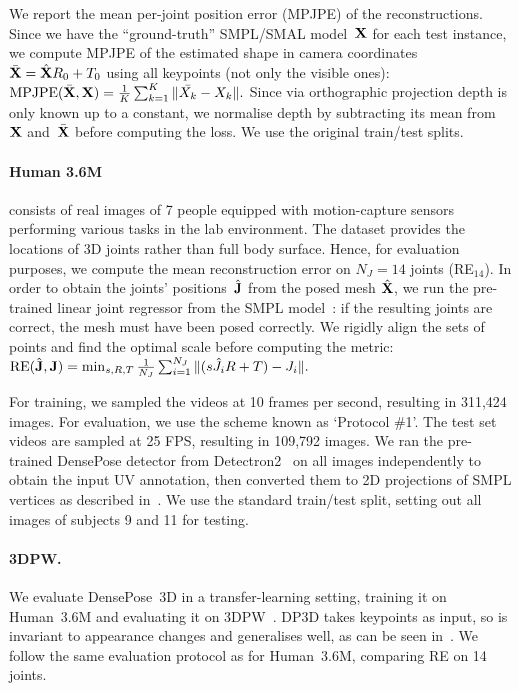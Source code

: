 We report the mean per-joint position error (MPJPE) of the reconstructions.
Since we have the ``ground-truth'' SMPL/SMAL model~$\mathbf{X}$ for each test instance, we compute MPJPE of the estimated shape in camera coordinates~$\bar{\mathbf{X}} = \hat{\mathbf{X}} R_0 + T_0$ using all keypoints (not only the visible ones):
$
\textrm{MPJPE}(\bar{\mathbf{X}}, \mathbf{X}) = \frac{1}{K} \sum_{k=1}^K \|\bar{X_k}- X_k \|.
$
Since via orthographic projection depth is only known up to a constant, we normalise depth by subtracting its mean from $\mathbf{X}$ and~$\bar{\mathbf{X}}$ before computing the loss.
We use the original train/test splits.



\paragraph{Human 3.6M} consists of real images of 7 people equipped with motion-capture sensors performing various tasks in the lab environment.
The dataset provides the locations of 3D joints rather than full body surface.
Hence, for evaluation purposes, we compute the mean reconstruction error on $N_J = 14$ joints (RE$_{14}$).
In order to obtain the joints' positions~$\hat{\mathbf{J}}$ from the posed mesh  $\hat{\mathbf{X}}$, we run the pre-trained linear joint regressor from the SMPL model~\cite{loper15smpl:}: if the resulting joints are correct, the mesh must have been posed correctly.
We rigidly align the sets of points and find the optimal scale before computing the metric:
$
\textrm{RE}(\hat{\mathbf{J}}, \mathbf{J}) = \min_{s,R,T} \frac{1}{N_J} \sum_{i=1}^{N_J} \|(s\hat{J_i}R + T) - J_i \|.
$

For training, we sampled the videos at 10 frames per second, resulting in 311,424 images.
For evaluation, we use the scheme known as `Protocol \#1'.
The test set videos are sampled at 25 FPS, resulting in 109,792 images.
We ran the pre-trained DensePose detector from Detectron2~\cite{wu2019detectron2} on all images independently to obtain the input UV annotation,
then converted them to 2D projections of SMPL vertices as described in~.
We use the standard train/test split, setting out all images of subjects 9 and 11 for testing.

\paragraph{3DPW.}

We evaluate DensePose~3D in a transfer-learning setting, training it on Human~3.6M and evaluating it on 3DPW~\cite{marcard18recovering}.
DP3D takes keypoints as input, so is invariant to appearance changes and generalises well, as can be seen in~.
We follow the same evaluation protocol as for Human~3.6M, comparing RE on 14 joints.

